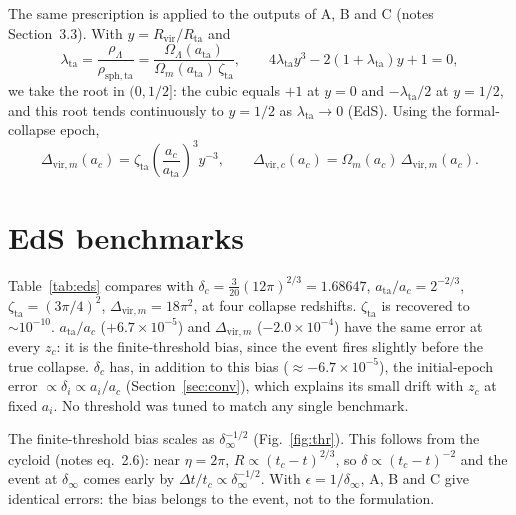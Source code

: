 \documentclass[11pt,a4paper]{article}
\newcommand{\res}{../results/exercise_4}
\begin{document}
The same prescription is applied to the outputs of A, B and C (notes Section~3.3).
With $y=R_\mathrm{vir}/R_\mathrm{ta}$ and
\begin{equation}
  \lambda_\mathrm{ta} = \frac{\rho_\Lambda}{\rho_\mathrm{sph,ta}} = \frac{\Omega_\Lambda(a_\mathrm{ta})}{\Omega_m(a_\mathrm{ta})\,\zeta_\mathrm{ta}},
  \qquad 4\lambda_\mathrm{ta}y^3 - 2(1+\lambda_\mathrm{ta})y + 1 = 0 ,
\end{equation}
we take the root in $(0,1/2]$: the cubic equals $+1$ at $y=0$ and $-\lambda_\mathrm{ta}/2$ at $y=1/2$, and this root tends continuously to $y=1/2$ as $\lambda_\mathrm{ta}\to0$ (EdS).
Using the formal-collapse epoch,
\begin{equation}
  \Delta_{\mathrm{vir},m}(a_c) = \zeta_\mathrm{ta}\left(\frac{a_c}{a_\mathrm{ta}}\right)^3 y^{-3},\qquad
  \Delta_{\mathrm{vir},c}(a_c) = \Omega_m(a_c)\,\Delta_{\mathrm{vir},m}(a_c).
\end{equation}

\section{EdS benchmarks}

Table~\ref{tab:eds} compares with $\delta_c = \frac{3}{20}(12\pi)^{2/3} = 1.68647$, $a_\mathrm{ta}/a_c = 2^{-2/3}$, $\zeta_\mathrm{ta}=(3\pi/4)^2$, $\Delta_{\mathrm{vir},m}=18\pi^2$, at four collapse redshifts.
$\zeta_\mathrm{ta}$ is recovered to $\sim10^{-10}$. $a_\mathrm{ta}/a_c$ ($+6.7\times10^{-5}$) and $\Delta_{\mathrm{vir},m}$ ($-2.0\times10^{-4}$) have the same error at every $z_c$: it is the finite-threshold bias, since the event fires slightly before the true collapse.
$\delta_c$ has, in addition to this bias ($\approx -6.7\times10^{-5}$), the initial-epoch error $\propto\delta_i\propto a_i/a_c$ (Section~\ref{sec:conv}), which explains its small drift with $z_c$ at fixed $a_i$. No threshold was tuned to match any single benchmark.

\begin{table}[h]
  \centering
  \caption{EdS validation: relative errors with respect to the exact values (default settings).}
  \label{tab:eds}
  \resizebox{\linewidth}{!}{}
\end{table}

The finite-threshold bias scales as $\delta_\infty^{-1/2}$ (Fig.~\ref{fig:thr}). This follows from the cycloid (notes eq.~2.6): near $\eta=2\pi$, $R\propto(t_c-t)^{2/3}$, so $\delta\propto(t_c-t)^{-2}$ and the event at $\delta_\infty$ comes early by $\Delta t/t_c\propto\delta_\infty^{-1/2}$.
With $\epsilon=1/\delta_\infty$, A, B and C give identical errors: the bias belongs to the event, not to the formulation.
\end{document}
